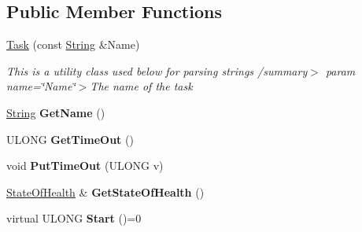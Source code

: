 \subsection*{Public Member Functions}
\begin{DoxyCompactItemize}
\item 
\mbox{\label{class_canberra_1_1_utility_1_1_core_1_1_task_a3df380ee480526aae62ae977494ab37d}} 
\hyperlink{class_canberra_1_1_utility_1_1_core_1_1_task_a3df380ee480526aae62ae977494ab37d}{Task} (const \hyperlink{class_canberra_1_1_utility_1_1_core_1_1_string}{String} \&Name)
\begin{DoxyCompactList}\small\item\em This is a utility class used below for parsing strings /summary$>$ param name=\char`\"{}\+Name\char`\"{}$>$The name of the task\end{DoxyCompactList}\item 
\mbox{\label{class_canberra_1_1_utility_1_1_core_1_1_task_a324ff17d5ddcd96853fa63afd339b1e9}} 
\hyperlink{class_canberra_1_1_utility_1_1_core_1_1_string}{String} {\bfseries Get\+Name} ()
\item 
\mbox{\label{class_canberra_1_1_utility_1_1_core_1_1_task_a311409b6377d6668ea0b1715a8757910}} 
U\+L\+O\+NG {\bfseries Get\+Time\+Out} ()
\item 
\mbox{\label{class_canberra_1_1_utility_1_1_core_1_1_task_a7492c07cbdc9b45dd5a258c30b8cedf6}} 
void {\bfseries Put\+Time\+Out} (U\+L\+O\+NG v)
\item 
\mbox{\label{class_canberra_1_1_utility_1_1_core_1_1_task_a35e9f4a1b71f40bb15e6d6c2b38e61cf}} 
\hyperlink{class_canberra_1_1_utility_1_1_core_1_1_state_of_health}{State\+Of\+Health} \& {\bfseries Get\+State\+Of\+Health} ()
\item 
\mbox{\label{class_canberra_1_1_utility_1_1_core_1_1_task_aaef15ad69f7b747b0fa3deac18149a3f}} 
virtual U\+L\+O\+NG {\bfseries Start} ()=0
\item 
\mbox{\label{class_canberra_1_1_utility_1_1_core_1_1_task_a02667d7d27a78e8c420ee878745bf694}} 

\end{DoxyCompactItemize}
